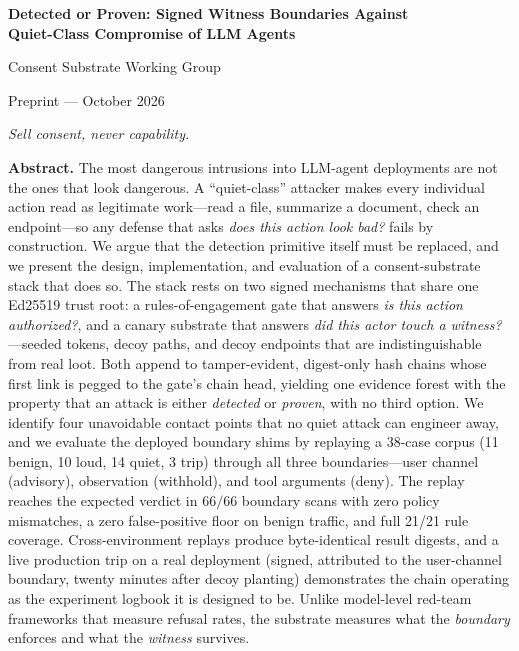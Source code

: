 \documentclass[11pt,a4paper]{article}
\begin{document}
\begingroup
\centering
{\LARGE\bfseries Detected or Proven: Signed Witness Boundaries Against\\[2pt] Quiet-Class Compromise of LLM Agents\par}
\vspace{0.8em}
{\normalsize Consent Substrate Working Group\par}
\vspace{0.2em}
{\small Preprint --- October 2026\par}
\vspace{0.4em}
{\small\itshape Sell consent, never capability.\par}
\endgroup
\vspace{1.2em}

\begin{center}
\begin{minipage}{0.92\textwidth}
\small
\textbf{Abstract.}
The most dangerous intrusions into LLM-agent deployments are not the ones that
look dangerous. A ``quiet-class'' attacker makes every individual action read as
legitimate work---read a file, summarize a document, check an endpoint---so any
defense that asks \emph{does this action look bad?} fails by construction. We
argue that the detection primitive itself must be replaced, and we present the
design, implementation, and evaluation of a consent-substrate stack that does
so. The stack rests on two signed mechanisms that share one Ed25519 trust root:
a rules-of-engagement gate that answers \emph{is this action authorized?}, and
a canary substrate that answers \emph{did this actor touch a witness?}---seeded
tokens, decoy paths, and decoy endpoints that are indistinguishable from real
loot. Both append to tamper-evident, digest-only hash chains whose first link
is pegged to the gate's chain head, yielding one evidence forest with the
property that an attack is either \emph{detected} or \emph{proven}, with no
third option. We identify four unavoidable contact points that no quiet attack
can engineer away, and we evaluate the deployed boundary shims by replaying a
38-case corpus (11 benign, 10 loud, 14 quiet, 3 trip) through all three
boundaries---user channel (advisory), observation (withhold), and tool
arguments (deny). The replay reaches the expected verdict in $66/66$
boundary scans with zero policy mismatches, a zero false-positive floor on
benign traffic, and full 21/21 rule coverage. Cross-environment replays
produce byte-identical result digests, and a live production trip on a
real deployment (signed, attributed to the user-channel boundary, twenty
minutes after decoy planting) demonstrates the chain operating as the
experiment logbook it is designed to be. Unlike model-level red-team
frameworks that measure refusal rates, the substrate measures what the
\emph{boundary} enforces and what the \emph{witness} survives.
\end{minipage}
\end{center}
\vspace{0.6em}
\end{document}
